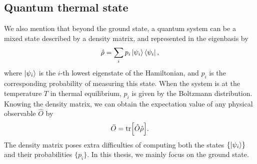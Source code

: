 \subsection{Quantum thermal state}

We also mention that beyond the ground state, a quantum system can be a mixed state described by a density matrix, and represented in the eigenbasis by
\begin{equation}
\hat{\rho} = \sum_i p_i \ket{\psi_i}\bra{\psi_i},
\end{equation}
where $\ket{\psi_i}$ is the $i$-th lowest eigenstate of the Hamiltonian, and $p_i$ is the corresponding probability of measuring this state. When the system is at the temperature $T$ in thermal equilibrium, $p_i$ is given by the Boltzmann distribution. Knowing the density matrix, we can obtain the expectation value of any physical observable $\hat{O}$ by
\begin{equation}
\bar{O} = \tr[\hat{O} \hat{\rho}].
\label{eq:dm-obs}
\end{equation}
The density matrix poses extra difficulties of computing both the states $\left\{ \ket{\psi_i} \right\}$ and their probabilities $\{p_i\}$. In this thesis, we mainly focus on the ground state.
